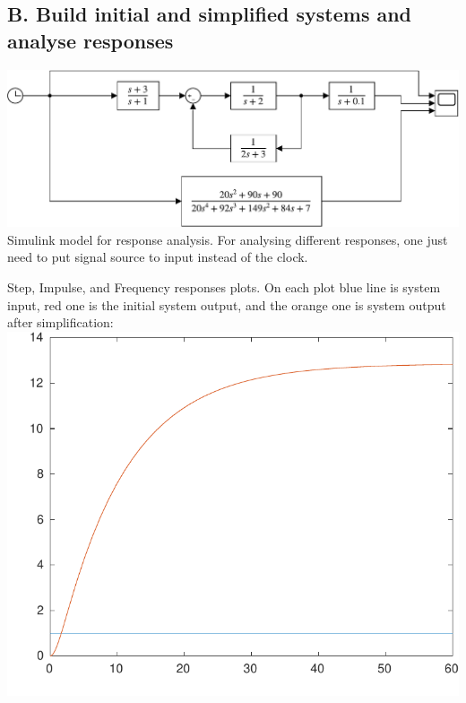\documentclass[a4paper,12pt]{article}
\begin{document}
    \subsection*{B. Build initial and simplified systems and analyse responses}
    \begin{center}
        \includegraphics[width=\linewidth]{../Task1/ToReport/T1Model.pdf}
        Simulink model for response analysis. For analysing different responses,
        one just need to put signal source to input instead of the clock.
    \end{center}
    Step, Impulse, and Frequency responses plots. On each plot blue line is 
    system input, red one is the initial system output, and the orange one is
    system output after simplification:\\
    \includegraphics[width=\linewidth/2]{../Task1/ToReport/T1StepResponse.pdf}
\end{document}
